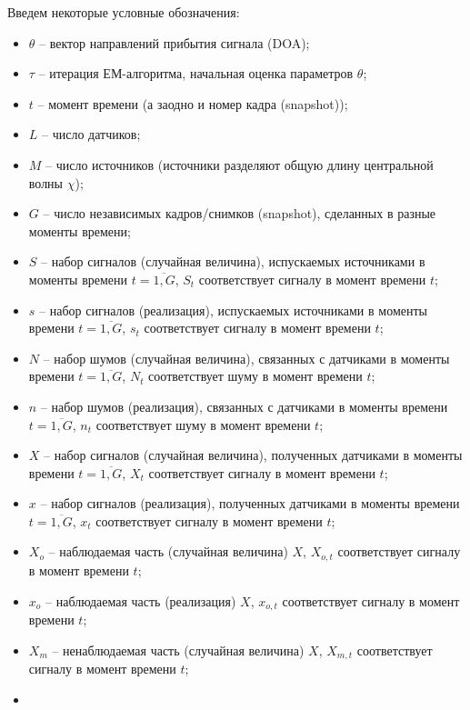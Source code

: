 \documentclass[11pt]{article}
\begin{document}
\begin{center}
\fontsize{20}{23}\selectfont {}
\end{center}
Введем некоторые условные обозначения:
\begin{itemize}
\item
$\theta$ -- вектор направлений прибытия сигнала (DOA);
\item
$\tau$ -- итерация ЕМ-алгоритма, начальная оценка параметров $\theta$;
\item
$t$ -- момент времени (а заодно и номер кадра (snapshot));
\item
$L$ -- число датчиков;
\item
$M$ -- число источников (источники разделяют общую длину центральной волны $\chi$);
\item
$G$ -- число независимых кадров/снимков (snapshot), сделанных в разные моменты времени;
\item
$S$ -- набор сигналов (случайная величина), испускаемых источниками в моменты времени $t=\overline{1,G}$, $S_t$ соответствует сигналу в момент времени $t$;
\item
$s$ -- набор сигналов (реализация), испускаемых источниками в моменты времени $t=\overline{1,G}$, $s_t$ соответствует сигналу в момент времени $t$;
\item
$N$ -- набор шумов (случайная величина), связанных с датчиками в моменты времени $t=\overline{1,G}$, $N_t$ соответствует шуму в момент времени $t$;
\item
$n$ -- набор шумов (реализация), связанных с датчиками в моменты времени $t=\overline{1,G}$, $n_t$ соответствует шуму в момент времени $t$;
\item
$X$ -- набор сигналов (случайная величина), полученных датчиками в моменты времени $t=\overline{1,G}$, $X_t$ соответствует сигналу в момент времени $t$;
\item
$x$ -- набор сигналов (реализация), полученных датчиками в моменты времени $t=\overline{1,G}$, $x_t$ соответствует сигналу в момент времени $t$;
\item
$X_o$ -- наблюдаемая часть (случайная величина) $X$, $X_{o,t}$ соответствует сигналу в момент времени $t$; 
\item
$x_o$ -- наблюдаемая часть (реализация) $X$, $x_{o,t}$ соответствует сигналу в момент времени $t$;
\item
$X_m$ -- ненаблюдаемая часть (случайная величина) $X$, $X_{m,t}$ соответствует сигналу в момент времени $t$;
\item

\end{itemize}
\end{document}

